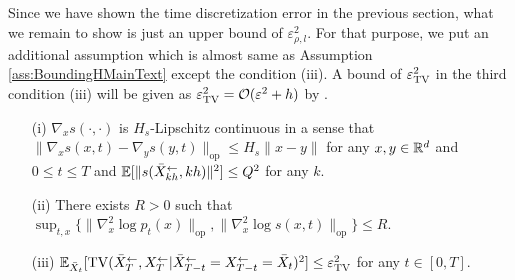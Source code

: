 
Since we have shown the time discretization error in the previous section, what we remain to show is just an upper bound of $\varepsilon_{\rho,l}^2$. For that purpose, we put an additional assumption which is almost same as Assumption \ref{ass:BoundingHMainText} except the condition (iii). 
A bound of $\varepsilon_{\mathrm{TV}}^2$ in the third condition (iii) will be given as 
$\varepsilon_{\mathrm{TV}}^2 = {\mathcal{O}}(\varepsilon^2 + h)$ by \cite{chen2023sampling}. 
\begin{assumption}\label{ass:BoundingH}
\begin{enumerate}[topsep=0mm,itemsep=-1mm,leftmargin = 6mm]
    \item[(i)] $\nabla_x s(\cdot,\cdot)$ is $H_s$-Lipschitz continuous in a sense that $\|\nabla_x s(x,t) - \nabla_y s(y,t)\|_{\mathrm{op}} \leq H_s \|x- y\|$
for any $x,y \in {\mathbb{R}}^d$ and $0 \leq t \leq T$ and $\mathbb{E}[\| s(\bar{X}_{kh}^\leftarrow,kh)\|^2] \leq Q^2$ for any $k$.
    \item[(ii)] There exists $R > 0$ such that $\sup_{t,x}\{\|\nabla_x^2 \log p_t(x)\|_{\mathrm{op}},\|\nabla_x^2 \log s(x,t)\|_{\mathrm{op}}\} \leq R$.
    \item[(iii)] $\mathbb{E}_{\bar{X}_t}[\mathrm{TV}(\bar{X}_{T}^\leftarrow,{X}_{T}^\leftarrow|\bar{X}_{T-t}^\leftarrow = {X}_{T-t}^\leftarrow = \bar{X}_t)^2] \leq \varepsilon_{\mathrm{TV}}^2$ for any $t \in [0,T]$.
\end{enumerate}    
\end{assumption}

